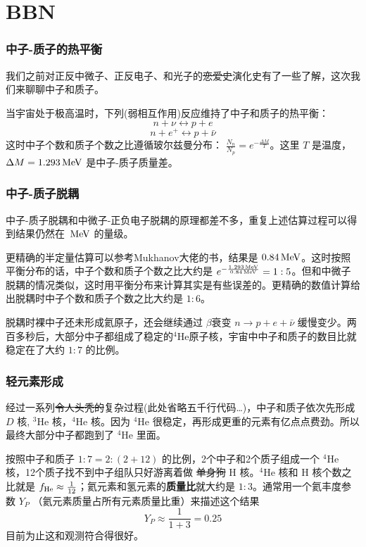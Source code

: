 \documentclass[CJK,13pt]{beamer}
\begin{document}
  
  \section{BBN}
  
  \begin{frame}
    \frametitle{中子-质子的热平衡}
    我们之前对正反中微子、正反电子、和光子的\sout{恋爱史}演化史有了一些了解，这次我们来聊聊中子和质子。

    \skipline
    
    当宇宙处于极高温时，下列(弱相互作用)反应维持了中子和质子的热平衡：
    $$ n+\nu \leftrightarrow p + e $$
    $$ n + e^+ \leftrightarrow p + \bar{\nu} $$
    这时中子个数和质子个数之比遵循玻尔兹曼分布： $\frac{N_n}{N_p}=e^{-\frac{\Delta M}{T}}$。这里 $T$ 是温度， $\Delta M = 1.293 \,\mathrm{MeV}$ 是中子-质子质量差。
  \end{frame}


  \begin{frame}
    \frametitle{中子-质子脱耦}
    中子-质子脱耦和中微子-正负电子脱耦的原理都差不多，重复上述估算过程可以得到结果仍然在 $\,\mathrm{MeV}$ 的量级。

    \skipline
    
    更精确的半定量估算可以参考Mukhanov大佬的书，结果是 $0.84\,\mathrm{MeV}$。这时按照平衡分布的话，中子个数和质子个数之比大约是 $e^{-\frac{1.293\,\mathrm{MeV}}{0.84\,\mathrm{MeV}}}=1:5$。但和中微子脱耦的情况类似，这时用平衡分布来计算其实是有些误差的。更精确的数值计算给出脱耦时中子个数和质子个数之比大约是 $1:6$。

    \skipline

    脱耦时裸中子还未形成氦原子，还会继续通过 $\beta$衰变 $n\rightarrow p+e+\bar{\nu}$ 缓慢变少。两百多秒后，大部分中子都组成了稳定的$^4\mathrm{He}$原子核，{\blue 宇宙中中子和质子的数目比就稳定在了大约 $1:7$ 的比例}。
  \end{frame}


  \begin{frame}
    \frametitle{轻元素形成}
    经过一系列\sout{令人头秃的}复杂过程(此处省略五千行代码…)，中子和质子依次先形成 $D$ 核, $^3\mathrm{He}$ 核，$^4\mathrm{He}$ 核。因为 $^4\mathrm{He}$ 很稳定，再形成更重的元素有亿点点费劲。所以最终大部分中子都跑到了 $^4\mathrm{He}$ 里面。

    \skipline
    
    按照中子和质子 $1:7 = 2:(2+12)$ 的比例，2个中子和2个质子组成一个 $^4\mathrm{He}$ 核，12个质子找不到中子组队只好游离着做 \sout{单身狗} $\mathrm{H}$ 核。$^4\mathrm{He}$ 核和 $\mathrm{H}$ 核个数之比就是 $f_{\rm He}\approx \frac{1}{12}$；氦元素和氢元素的{\bf 质量比}就大约是 $1:3$。通常用一个氦丰度参数 $Y_P$ （氦元素质量占所有元素质量比重）来描述这个结果
    $$Y_P\approx \frac{1}{1+3} = 0.25$$
    目前为止这和观测符合得很好。
  \end{frame}
\end{document}
